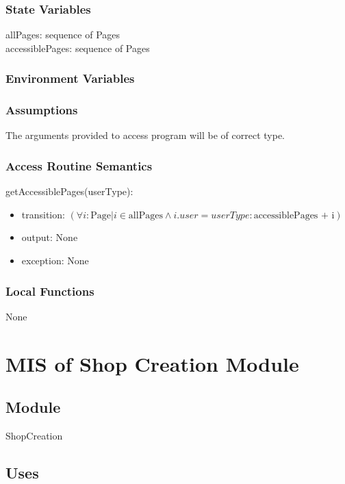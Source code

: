 \documentclass[12pt, titlepage]{article}
\begin{document}
\subsubsection{State Variables}

allPages: sequence of Pages \\
accessiblePages: sequence of Pages


\subsubsection{Environment Variables}


\subsubsection{Assumptions}

The arguments provided to access program will be of correct type.

\subsubsection{Access Routine Semantics}

\noindent getAccessiblePages(userType):
\begin{itemize}
\item transition: $(\forall i: \text{Page}| i \in \text{allPages} \land i.user = userType : \text{accessiblePages + i})$ 
\item output: None
\item exception: None
\end{itemize}

\subsubsection{Local Functions}

None

\newpage

\section{MIS of Shop Creation Module} \label{mShopCreation}

\subsection{Module}

ShopCreation

\subsection{Uses}
\end{document}
